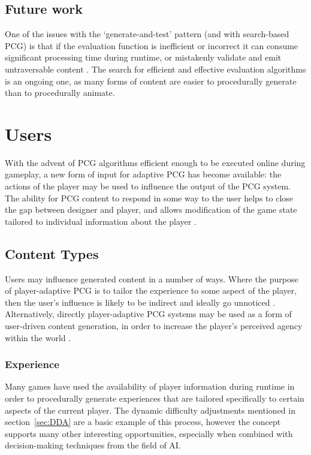\documentclass{acm_proc_article-sp}
\begin{document}
\subsection{Future work}
One of the issues with the `generate-and-test' pattern (and with search-based PCG) is that if the evaluation function is inefficient or incorrect it can consume significant processing time during runtime, or mistakenly validate and emit untraversable content \cite{hendrikx2012procedural}. The search for efficient and effective evaluation algorithms is an ongoing one, as many forms of content are easier to procedurally generate than to procedurally animate.

\section{Users}
With the advent of PCG algorithms efficient enough to be executed online during gameplay, a new form of input for adaptive PCG has become available: the actions of the player may be used to influence the output of the PCG system.
The ability for PCG content to respond in some way to the user helps to close the gap between designer and player, and allows modification of the game state tailored to individual information about the player \cite{sorenson2010towards}.

\subsection{Content Types}
Users may influence generated content in a number of ways. Where the purpose of player-adaptive PCG is to tailor the experience to some aspect of the player, then the user's influence is likely to be indirect and ideally go unnoticed \cite{citeulike:7364450}. Alternatively, directly player-adaptive PCG systems may be used as a form of user-driven content generation, in order to increase the player's perceived agency within the world \cite{bartle2004designing}.

\subsubsection{Experience}
Many games have used the availability of player information during runtime in order to procedurally generate experiences that are tailored specifically to certain aspects of the current player. The dynamic difficulty adjustments mentioned in section~\ref{sec:DDA} are a basic example of this process, however the concept supports many other interesting opportunities, especially when combined with decision-making techniques from the field of AI. 
\end{document}
